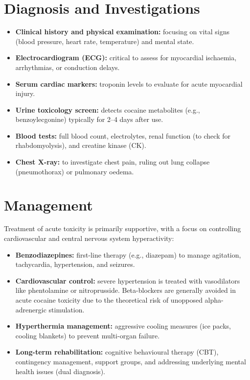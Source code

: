 \section*{Diagnosis and Investigations}
\begin{itemize}
    \item \textbf{Clinical history and physical examination:} focusing on vital signs (blood pressure, heart rate, temperature) and mental state.
    \item \textbf{Electrocardiogram (ECG):} critical to assess for myocardial ischaemia, arrhythmias, or conduction delays.
    \item \textbf{Serum cardiac markers:} troponin levels to evaluate for acute myocardial injury.
    \item \textbf{Urine toxicology screen:} detects cocaine metabolites (e.g., benzoylecgonine) typically for 2--4 days after use.
    \item \textbf{Blood tests:} full blood count, electrolytes, renal function (to check for rhabdomyolysis), and creatine kinase (CK).
    \item \textbf{Chest X-ray:} to investigate chest pain, ruling out lung collapse (pneumothorax) or pulmonary oedema.
\end{itemize}

\section*{Management}
Treatment of acute toxicity is primarily supportive, with a focus on controlling cardiovascular and central nervous system hyperactivity:

\begin{itemize}
    \item \textbf{Benzodiazepines:} first-line therapy (e.g., diazepam) to manage agitation, tachycardia, hypertension, and seizures.
    \item \textbf{Cardiovascular control:} severe hypertension is treated with vasodilators like phentolamine or nitroprusside. Beta-blockers are generally avoided in acute cocaine toxicity due to the theoretical risk of unopposed alpha-adrenergic stimulation.
    \item \textbf{Hyperthermia management:} aggressive cooling measures (ice packs, cooling blankets) to prevent multi-organ failure.
    \item \textbf{Long-term rehabilitation:} cognitive behavioural therapy (CBT), contingency management, support groups, and addressing underlying mental health issues (dual diagnosis).
\end{itemize}

